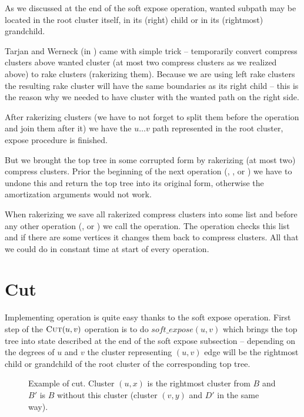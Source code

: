 As we discussed at the end of the soft expose operation, wanted subpath may be
located in the root cluster itself, in its (right) child or in its (rightmost)
grandchild.

Tarjan and Werneck (in \cite{SelfAdjustingTT}) came with simple trick -- temporarily
convert compress clusters above wanted cluster (at most two compress clusters as
we realized above) to rake clusters ({\I rakerizing} them). Because we are using
left rake clusters the resulting rake cluster will have the same boundaries as
its right child -- this is the reason why we needed to have cluster with the
wanted path on the right side.

After rakerizing clusters (we have to not forget to split them before the
operation and join them after it) we have the $u\dots v$ path represented in
the root cluster, expose procedure is finished.

But we brought the top tree in some corrupted form by rakerizing (at most two)
compress clusters. Prior the beginning of the next operation (\Expose, \Link, \Cut{}
or \Search) we have to undone this and return the top tree into its original
form, otherwise the amortization arguments would not work.

When rakerizing we save all rakerized compress clusters into some list and
before any other operation (\Cut, \Link{} or \Expose) we call the \Restore{} operation.
The \Restore{} operation checks this list and if there are some vertices it changes
them back to compress clusters. All that we could do in constant time at start
of every operation.

\section{Cut}

Implementing \Cut{} operation is quite easy thanks to the soft expose operation.
First step of the $\hbox{\sc Cut}(u,v)$ operation is to do $soft\_expose(u,v)$ which brings
the top tree into state described at the end of the soft expose subsection
-- depending on the degrees of $u$ and $v$ the cluster representing
$(u,v)$ edge will be the rightmost child or grandchild of the root cluster of the
corresponding top tree.

\begin{figure}[H]
\centering
{}
\caption[Example of cut]
{Example of cut. Cluster $(u,x)$ is the rightmost cluster from $B$ and
$B'$ is $B$ without this cluster (cluster $(v,y)$ and $D'$ in the same way).}
\end{figure}

